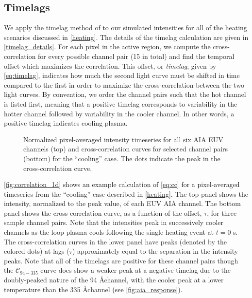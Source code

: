 \subsection{Timelags}\label{timelags}

We apply the timelag method of \citet{viall_evidence_2012} to our simulated intensities for all of the heating scenarios discussed in \autoref{heating}. The details of the timelag calculation are given in \autoref{timelag_details}. For each pixel in the active region, we compute the cross-correlation for every possible channel pair (15 in total) and find the temporal offset which maximizes the correlation. This offset, or \textit{timelag}, given by \autoref{eq:timelag}, indicates how much the second light curve must be shifted in time compared to the first in order to maximize the cross-correlation between the two light curves. By convention, we order the channel pairs such that the hot channel is listed first, meaning that a positive timelag corresponds to variability in the hotter channel followed by variability in the cooler channel. In other words, a positive timelag indicates cooling plasma.

\begin{figure}
    \caption{Normalized pixel-averaged intensity timeseries for all six AIA EUV channels (top) and cross-correlation curves for selected channel pairs (bottom) for the ``cooling'' case. The dots indicate the peak in the cross-correlation curve.}
    \label{fig:correlation_1d}
\end{figure}

\autoref{fig:correlation_1d} shows an example calculation of \autoref{eq:cc} for a pixel-averaged timeseries from the ``cooling'' case described in \autoref{heating}. The top panel shows the intensity, normalized to the peak value, of each EUV AIA channel. The bottom panel shows the cross-correlation curve, as a function of the offset, $\tau$, for three sample channel pairs. Note that the intensities peak in successively cooler channels as the loop plasma cools following the single heating event at $t=0$ s. The cross-correlation curves in the lower panel have peaks (denoted by the colored dots) at lags ($\tau$) approximately equal to the separation in the intensity peaks. Note that all of the timelags are positive for these channel pairs though the $\mathcal{C}_{94-335}$ curve does show a weaker peak at a negative timelag due to the doubly-peaked nature of the 94 \AA channel, with the cooler peak at a lower temperature than the 335 \AA channel (see \autoref{fig:aia_response}).

